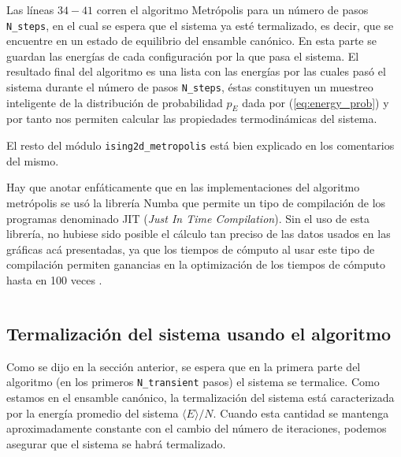 \documentclass[%
 reprint,
 amsmath,amssymb,
 aps,
 pra,
]{revtex4-2}
\begin{document}
	Las líneas $34-41$ corren el algoritmo Metrópolis para un número de pasos \texttt{N_steps}, en el cual se espera que el sistema ya esté termalizado, es decir, que se encuentre en un estado de equilibrio del ensamble canónico. En esta parte se guardan las energías de cada configuración por la que pasa el sistema. El resultado final del algoritmo es una lista con las energías por las cuales pasó el sistema durante el número de pasos \texttt{N_steps}, éstas constituyen un muestreo inteligente de la distribución de probabilidad $p_E$ dada por (\ref{eq:energy_prob}) y por tanto nos permiten calcular las propiedades termodinámicas del sistema.
	
	El resto del módulo \texttt{ising2d_metropolis} está bien explicado en los comentarios del mismo.

	Hay que anotar enfáticamente que en las implementaciones del algoritmo metrópolis se usó la librería Numba que permite un tipo de compilación de los programas denominado JIT (\textit{Just In Time Compilation}). Sin el uso de esta librería, no hubiese sido posible el cálculo tan preciso de las datos usados en las gráficas acá presentadas, ya que los tiempos de cómputo al usar este tipo de compilación permiten ganancias en la optimización de los tiempos de cómputo hasta en 100 veces \cite{10.1145/2833157.2833162}.

		\inputminted[linenos,breaklines]{python}{ising2d-metropolis-z-retazo.py}


	\subsection{Termalización del sistema usando el algoritmo\label{subsec:metropolis-termalizacion}}

	Como se dijo en la sección anterior, se espera que en la primera parte del algoritmo (en los primeros \texttt{N_transient} pasos) el sistema se termalice. Como estamos en el ensamble canónico, la termalización del sistema está caracterizada por la energía promedio del sistema $\langle E \rangle / N$. Cuando esta cantidad se mantenga aproximadamente constante con el cambio del número de iteraciones, podemos asegurar que el sistema se habrá termalizado.
	
\end{document}
